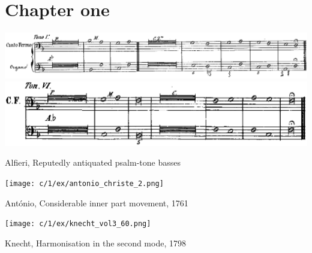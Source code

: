 \section{Chapter one}

\vspace*{\fill}

\begin{example}
  \centering
  \includegraphics[width=\linewidth]{c/1/ex/alfieri_tone2_5long.jpg}
  \vspace*{2em}
  \includegraphics[width=.8\linewidth]{c/1/ex/alfieri_tone6_7long.png}
  \caption{Alfieri, Reputedly antiquated psalm-tone basses}
  \label{mus:alfieri_antiquated}
\end{example}

\vspace*{\fill}

\newpage

\vspace*{\fill}

\begin{example}
  \centering
  \texttt{[image: c/1/ex/antonio\_christe\_2.png]}
  \caption{António, Considerable inner part movement, 1761}
  \label{mus:antonio_christe}
\end{example}

\vspace*{\fill}

\begin{example}
  \centering
  \texttt{[image: c/1/ex/knecht\_vol3\_60.png]}
  \caption{Knecht, Harmonisation in the second mode, 1798}
  \label{mus:knecht_secondmode}
\end{example}

\vspace*{\fill}

